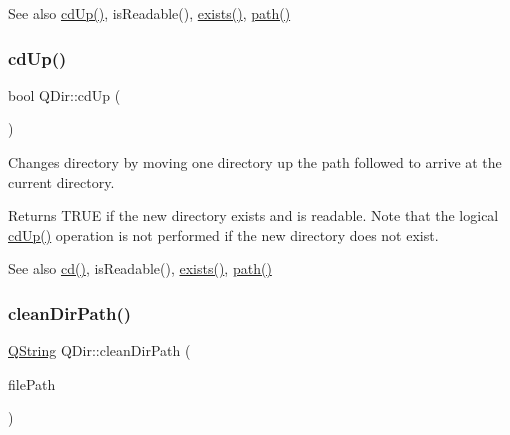 \begin{DoxySeeAlso}{See also}
\mbox{\hyperlink{class_q_dir_a22a212babdfa332de6ee9d07f96dc2ba}{cd\+Up()}}, is\+Readable(), \mbox{\hyperlink{class_q_dir_a97e8132d482e374745230de942def208}{exists()}}, \mbox{\hyperlink{class_q_dir_a6258e0803c991909e0ce38e40f6f07ec}{path()}} 
\end{DoxySeeAlso}
\mbox{\label{class_q_dir_a22a212babdfa332de6ee9d07f96dc2ba}} 
\subsubsection{\texorpdfstring{cdUp()}{cdUp()}}
{\footnotesize\ttfamily bool Q\+Dir\+::cd\+Up (\begin{DoxyParamCaption}{ }\end{DoxyParamCaption})\hspace{0.3cm}{\ttfamily [virtual]}}

Changes directory by moving one directory up the path followed to arrive at the current directory.

Returns T\+R\+UE if the new directory exists and is readable. Note that the logical \mbox{\hyperlink{class_q_dir_a22a212babdfa332de6ee9d07f96dc2ba}{cd\+Up()}} operation is not performed if the new directory does not exist.

\begin{DoxySeeAlso}{See also}
\mbox{\hyperlink{class_q_dir_a5a58d7a5387627fa479f2ac376895e6a}{cd()}}, is\+Readable(), \mbox{\hyperlink{class_q_dir_a97e8132d482e374745230de942def208}{exists()}}, \mbox{\hyperlink{class_q_dir_a6258e0803c991909e0ce38e40f6f07ec}{path()}} 
\end{DoxySeeAlso}
\mbox{\label{class_q_dir_ad38037708dc754f5bdd877c145dbbb19}} 
\subsubsection{\texorpdfstring{cleanDirPath()}{cleanDirPath()}}
{\footnotesize\ttfamily \mbox{\hyperlink{class_q_string}{Q\+String}} Q\+Dir\+::clean\+Dir\+Path (\begin{DoxyParamCaption}\item[{const \mbox{\hyperlink{class_q_string}{Q\+String}} \&}]{file\+Path }\end{DoxyParamCaption})\hspace{0.3cm}{\ttfamily [static]}}

